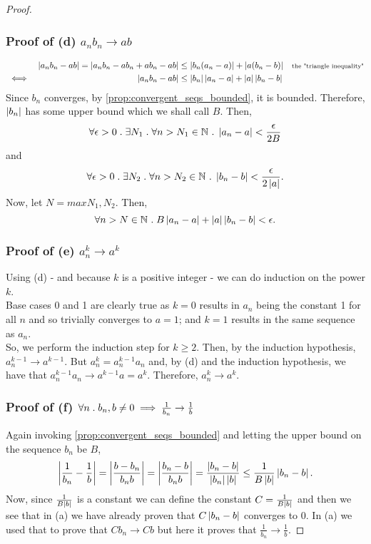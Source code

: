 \documentclass[MathsNotesBase.tex]{subfiles}
\begin{document}
{\begin{proof}
			\subsubsection{Proof of (d) $ a_nb_n \to ab $}
			\begin{align*}
			&& \left\lvert a_nb_n - ab\right\rvert = \left\lvert a_nb_n - ab_n + ab_n - ab\right\rvert &\leq \left\lvert b_n(a_n - a)\right\rvert + \left\lvert a(b_n - b)\right\rvert  &\text{\scriptsize{the "triangle inequality"}}\\
			&\iff & \left\lvert a_nb_n - ab\right\rvert &\leq \left\lvert b_n\right\rvert\left\lvert a_n - a\right\rvert + \left\lvert a\right\rvert\left\lvert b_n - b\right\rvert  &\text{\scriptsize{}} \\
			\end{align*}
			Since $b_n$ converges, by \autoref{prop:convergent_seqs_bounded}, it is bounded. Therefore, $\left\lvert b_n\right\rvert$ has some upper bound which we shall call $B$. Then,
			\[ \forall \epsilon > 0 \;.\; \exists N_1 \;.\; \forall n > N_1 \in \mathbb{N}^{} \;.\; \left\lvert a_n - a\right\rvert < \frac{\epsilon}{2B} \]
			and
			\[ \forall \epsilon > 0 \;.\; \exists N_2 \;.\; \forall n > N_2 \in \mathbb{N}^{} \;.\; \left\lvert b_n - b\right\rvert < \frac{\epsilon}{2\left\lvert a\right\rvert}. \]
			Now, let ${ N = max{N_1, N_2}. }$ Then,
			\[ \forall n > N \in \mathbb{N}^{} \;.\; B\left\lvert a_n - a\right\rvert + \left\lvert a\right\rvert\left\lvert b_n - b\right\rvert < \epsilon. \]
			
			\subsubsection{Proof of (e) $ a_n^k \to a^k $}
			Using (d) - and because $k$ is a positive integer - we can do induction on the power $k$.\\
			Base cases 0 and 1 are clearly true as ${ k = 0 }$ results in $a_n$ being the constant 1 for all $n$ and so trivially converges to ${ a = 1 }$; and ${ k = 1 }$ results in the same sequence as $a_n$.\\
			So, we perform the induction step for ${ k \geq 2 }$. Then, by the induction hypothesis, ${ a_n^{k-1} \to a^{k-1} }$. But ${ a_n^k = a_n^{k-1}a_n }$ and, by (d) and the induction hypothesis, we have that ${ a_n^{k-1}a_n \to a^{k-1}a = a^k }$. Therefore, ${ a_n^k \to a^k. }$
			
			\subsubsection{Proof of (f) $ \forall n \;.\; b_n, b \neq 0 \implies \frac{1}{b_n} \to \frac{1}{b} $}
			Again invoking \autoref{prop:convergent_seqs_bounded} and letting the upper bound on the sequence $b_n$ be $B$,
			\[ \left\lvert\frac{1}{b_n} - \frac{1}{b}\right\rvert = \left\lvert\frac{b - b_n}{b_nb}\right\rvert = \left\lvert\frac{b_n - b}{b_nb}\right\rvert = \frac{ \left\lvert b_n - b\right\rvert }{ \left\lvert b_n\right\rvert\left\lvert b\right\rvert } \leq \frac{1}{B\left\lvert b\right\rvert}\left\lvert b_n - b\right\rvert. \]
			Now, since $\frac{1}{B\left\lvert b\right\rvert}$ is a constant we can define the constant ${ C = \frac{1}{B\left\lvert b\right\rvert} }$ and then we see that in (a) we have already proven that ${ C\left\lvert b_n - b\right\rvert }$ converges to 0. In (a) we used that to prove that ${ Cb_n \to Cb }$ but here it proves that ${ \frac{1}{b_n} \to \frac{1}{b}. }$
		\end{proof}
	}
\end{document}
